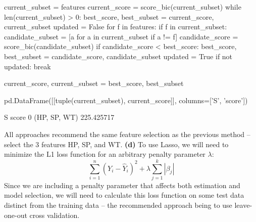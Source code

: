 \begin{python}
current_subset = features
current_score = score_bic(current_subset)
while len(current_subset) > 0:
    best_score, best_subset = current_score, current_subset
    updated = False
    for f in features:
        if f in current_subset:
            candidate_subset = [a for a in current_subset if a != f]
            candidate_score = score_bic(candidate_subset)
            if candidate_score < best_score:
                best_score, best_subset = candidate_score, candidate_subset
                updated = True              
    if not updated:
        break
        
    current_score, current_subset = best_score, best_subset
    
pd.DataFrame([[tuple(current_subset), current_score]], columns=['S', 'score'])
\end{python}
\begin{console}
              S       score
0  (HP, SP, WT)  225.425717
\end{console}
All approaches recommend the same feature selection as the previous
method -- select the 3 features HP, SP, and WT.
\textbf{(d)} To use Lasso, we will need to minimize the L1 loss function
for an arbitrary penalty parameter \(\lambda\):
\[
\sum_{i=1}^{n} (Y_{i} - \hat{Y}_{i})^{2} + \lambda \sum_{j=1}^{k} | \beta_{j} |
\]
Since we are including a penalty parameter that affects both estimation
and model selection, we will need to calculate this loss function on
some test data distinct from the training data -- the recommended
approach being to use leave-one-out cross validation.

